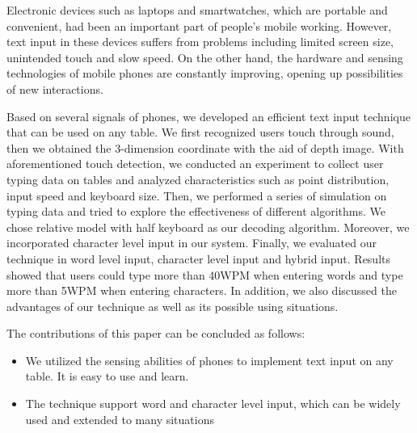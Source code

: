 \begin{abstract*}
    Electronic devices such as laptops and smartwatches, which are portable and convenient, had been an important part of people's mobile working. However, text input in these devices suffers from problems including limited screen size, unintended touch and slow speed. On the other hand, the hardware and sensing technologies of mobile phones are constantly improving, opening up possibilities of new interactions.
    
    Based on several signals of phones, we developed an efficient text input technique that can be used on any table. We first recognized users touch through sound, then we obtained the 3-dimension coordinate with the aid of depth image. With aforementioned touch detection, we conducted an experiment to collect user typing data on tables and analyzed characteristics such as point distribution, input speed and keyboard size. Then, we performed a series of simulation on typing data and tried to explore the effectiveness of different algorithms. We chose relative model with half keyboard as our decoding algorithm. Moreover, we incorporated character level input in our system. Finally, we evaluated our technique in word level input, character level input and hybrid input. Results showed that users could type more than 40WPM when entering words and 
   type more than 5WPM when entering characters. In addition, we also discussed the advantages of our technique as well as its possible using situations.
    
    The contributions of this paper can be concluded as follows:
    \begin{itemize}
        \item We utilized the sensing abilities of phones to implement text input on any table. It is easy to use and learn.
        \item The technique support word and character level input, which can be widely used and extended to many situations
    \end{itemize}
\end{abstract*}
